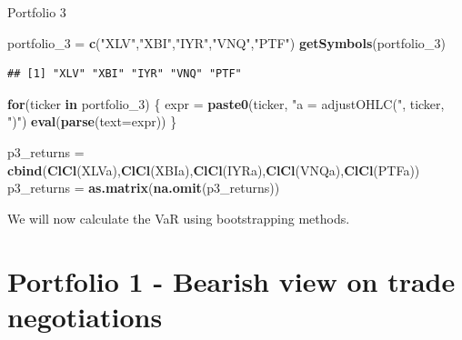\documentclass[]{article}
\newenvironment{Shaded}{\begin{snugshade}}{\end{snugshade}}
\newcommand{\ControlFlowTok}[1]{\textcolor[rgb]{0.13,0.29,0.53}{\textbf{#1}}}
\newcommand{\DataTypeTok}[1]{\textcolor[rgb]{0.13,0.29,0.53}{#1}}
\newcommand{\DecValTok}[1]{\textcolor[rgb]{0.00,0.00,0.81}{#1}}
\newcommand{\KeywordTok}[1]{\textcolor[rgb]{0.13,0.29,0.53}{\textbf{#1}}}
\newcommand{\NormalTok}[1]{#1}
\newcommand{\StringTok}[1]{\textcolor[rgb]{0.31,0.60,0.02}{#1}}
\begin{document}
Portfolio 3

\begin{Shaded}
\begin{Highlighting}[]
\NormalTok{portfolio_}\DecValTok{3}\NormalTok{ =}\StringTok{ }\KeywordTok{c}\NormalTok{(}\StringTok{"XLV"}\NormalTok{,}\StringTok{"XBI"}\NormalTok{,}\StringTok{"IYR"}\NormalTok{,}\StringTok{"VNQ"}\NormalTok{,}\StringTok{"PTF"}\NormalTok{)}
\KeywordTok{getSymbols}\NormalTok{(portfolio_}\DecValTok{3}\NormalTok{)}
\end{Highlighting}
\end{Shaded}

\begin{verbatim}
## [1] "XLV" "XBI" "IYR" "VNQ" "PTF"
\end{verbatim}

\begin{Shaded}
\begin{Highlighting}[]
\ControlFlowTok{for}\NormalTok{(ticker }\ControlFlowTok{in}\NormalTok{ portfolio_}\DecValTok{3}\NormalTok{) \{}
\NormalTok{  expr =}\StringTok{ }\KeywordTok{paste0}\NormalTok{(ticker, }\StringTok{"a = adjustOHLC("}\NormalTok{, ticker, }\StringTok{")"}\NormalTok{)}
  \KeywordTok{eval}\NormalTok{(}\KeywordTok{parse}\NormalTok{(}\DataTypeTok{text=}\NormalTok{expr))}
\NormalTok{\}}

\NormalTok{p3_returns =}\StringTok{ }\KeywordTok{cbind}\NormalTok{(}\KeywordTok{ClCl}\NormalTok{(XLVa),}\KeywordTok{ClCl}\NormalTok{(XBIa),}\KeywordTok{ClCl}\NormalTok{(IYRa),}\KeywordTok{ClCl}\NormalTok{(VNQa),}\KeywordTok{ClCl}\NormalTok{(PTFa))}
\NormalTok{p3_returns =}\StringTok{ }\KeywordTok{as.matrix}\NormalTok{(}\KeywordTok{na.omit}\NormalTok{(p3_returns))}
\end{Highlighting}
\end{Shaded}

We will now calculate the VaR using bootstrapping methods.

\hypertarget{portfolio-1---bearish-view-on-trade-negotiations}{%
\section{Portfolio 1 - Bearish view on trade
negotiations}\label{portfolio-1---bearish-view-on-trade-negotiations}}
\end{document}
